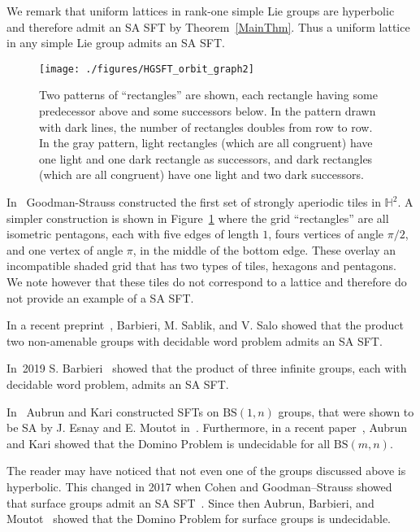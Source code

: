 \documentclass[12pt,reqno]{amsart}
\theoremstyle{plain}
\theoremstyle{definition}
\numberwithin{subcase}{case}
\theoremstyle{plain}
\theoremstyle{definition}
\begin{document}
We remark that uniform lattices in rank-one simple Lie groups are hyperbolic and therefore admit an SA SFT by Theorem~\ref{MainThm}. Thus a uniform lattice in any simple Lie group admits an SA SFT.

\begin{figure}
\centerline{{\texttt{[image: ./figures/HGSFT\_orbit\_graph2]}}}
\caption{Two patterns of ``rectangles'' are shown, each rectangle having some predecessor above
and some successors below. In the pattern drawn with dark lines, the number of rectangles
doubles from row to row. In the gray pattern, light rectangles (which are all congruent)
have one light and one dark rectangle as successors, and dark rectangles (which are all
congruent) have one light and two dark successors.}
\label{SA_SFT_H2}
\end{figure}

In~\cite{MR2142334} Goodman-Strauss constructed the first set of strongly aperiodic tiles in \(\mathbb{H}^{2}\). A simpler construction is shown in Figure~\ref{SA_SFT_H2} where the grid ``rectangles'' are all isometric pentagons, each with five edges of length \(1\), fours vertices of angle \(\pi/2\), and one vertex of angle \(\pi\), in the middle of the bottom edge. These overlay an incompatible shaded grid that has two types of tiles, hexagons and pentagons. We note however that these tiles do not correspond to a lattice and therefore do not provide an example of a SA SFT.

In a recent preprint~\cite{ProdusctOfNonAmenable}, Barbieri, M. Sablik, and V. Salo showed that the product two non-amenable groups with decidable word problem admits an SA SFT. 

In~2019 S. Barbieri~\cite{MR3964145} showed that the product of three infinite groups, each with decidable word problem, admits an SA SFT. 



In~\cite{MR3594268} Aubrun and Kari constructed SFTs on   \(\mathrm{BS}(1,n)\) groups, that were shown to be SA  by J. Esnay and E. Moutot in~\cite{esnay2021weakly}. Furthermore, in a recent paper~\cite{AUBRUN2021}, Aubrun and Kari showed that the Domino Problem is undecidable for all \(\mathrm{BS}(m,n)\). 

The reader may have noticed that not even one of the groups discussed above is hyperbolic. This changed in 2017 when Cohen and Goodman--Strauss showed that surface groups admit an SA SFT~\cite{MR3692905}. Since then Aubrun, Barbieri, and Moutot~\cite{DominoForSurfaceGroups} showed that the Domino Problem for surface groups is undecidable. 
\end{document}
